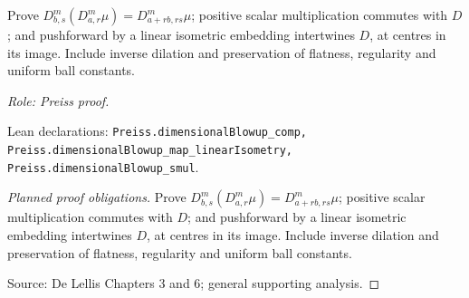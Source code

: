 \begin{lemma}
\label{lem:blowup-composition}






Prove
$D^m_{b,s}(D^m_{a,r}\mu)=D^m_{a+rb,rs}\mu$;
positive scalar multiplication commutes with $D$; and pushforward by a linear
isometric embedding intertwines $D$, at centres in its image. Include inverse
dilation and preservation of flatness, regularity and uniform ball constants.
\par\emph{Role: Preiss proof.}
\par Lean declarations: \texttt{Preiss.dimensionalBlowup\_comp, Preiss.dimensionalBlowup\_map\_linearIsometry, Preiss.dimensionalBlowup\_smul}.
\end{lemma}
\begin{proof}[Planned proof obligations]

Prove
$D^m_{b,s}(D^m_{a,r}\mu)=D^m_{a+rb,rs}\mu$;
positive scalar multiplication commutes with $D$; and pushforward by a linear
isometric embedding intertwines $D$, at centres in its image. Include inverse
dilation and preservation of flatness, regularity and uniform ball constants.
\par Source: De Lellis Chapters 3 and 6; general supporting analysis.
\end{proof}

